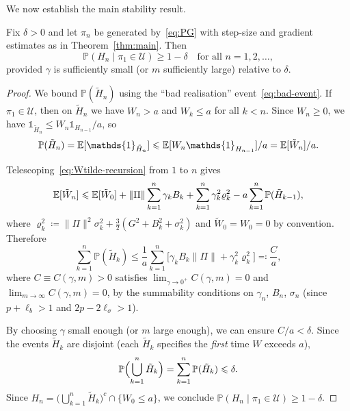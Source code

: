 \documentclass[a4paper,oneside,11pt]{report}
\newcommand{\ind}{\mathds{1}}
\newcommand{\Prob}{\mathbb{P}}
\newcommand{\calU}{\mathcal{U}}
\newcommand{\norm}[1]{\| #1 \|}
\numberwithin{theorem}{chapter}
\numberwithin{equation}{chapter}
\begin{document}
We now establish the main stability result.

\begin{proposition}
  \label{prop:stability}
  Fix $\delta > 0$ and let $\pi_n$ be generated by~\eqref{eq:PG} with
  step-size and gradient estimates as in Theorem~\ref{thm:main}. Then
  \begin{equation}
    \label{eq:stability}
    \Prob(H_n \mid \pi_1 \in \calU) \ge 1 - \delta
    \quad \text{for all } n = 1, 2, \ldots,
  \end{equation}
  provided $\gamma$ is sufficiently small (or $m$ sufficiently large)
  relative to $\delta$.
\end{proposition}

\begin{proof}
  We bound $\Prob(\tilde H_n)$ using the ``bad realisation''
  event~\eqref{eq:bad-event}. If $\pi_1 \in \calU$, then on
  $\tilde H_n$ we have $W_n > a$ and $W_k \le a$ for all $k < n$. Since
  $W_n \ge 0$, we have $\ind_{\tilde H_n} \le W_n \ind_{H_{n-1}} / a$,
  so
  \begin{equation}
    \Prob(\tilde H_n) = \E[\ind_{\tilde H_n}]
    \le \E[W_n \ind_{H_{n-1}}] / a
    = \E[\tilde W_n] / a.
    \label{eq:Htilde-Markov}
  \end{equation}

  Telescoping~\eqref{eq:Wtilde-recursion} from $1$ to $n$ gives
  \begin{equation}
    \E[\tilde W_n] \le \E[\tilde W_0]
    + \norm{\Pi} \sum_{k=1}^n \gamma_k B_k
    + \sum_{k=1}^n \gamma_k^2 \varrho_k^2
    - a \sum_{k=1}^n \Prob(\tilde H_{k-1}),
    \label{eq:Wtilde-telescope}
  \end{equation}
  where
  $\varrho_k^2 \coloneqq \norm{\Pi}^2 \sigma_k^2
  + \tfrac{3}{2}(G^2 + B_k^2 + \sigma_k^2)$ and
  $\tilde W_0 = W_0 = 0$ by convention. Therefore
  \begin{equation}
    \sum_{k=1}^n \Prob(\tilde H_k) \le \frac{1}{a}
    \sum_{k=1}^n \bigl[\gamma_k B_k \norm{\Pi}
      + \gamma_k^2 \varrho_k^2\bigr]
    \eqqcolon \frac{C}{a},
    \label{eq:sum-Htilde}
  \end{equation}
  where $C \equiv C(\gamma, m) > 0$ satisfies
  $\lim_{\gamma \to 0^+} C(\gamma, m) = 0$ and
  $\lim_{m \to \infty} C(\gamma, m) = 0$, by the summability conditions
  on $\gamma_n$, $B_n$, $\sigma_n$ (since $p + \ell_b > 1$ and
  $2p - 2\ell_\sigma > 1$).

  By choosing $\gamma$ small enough (or $m$ large enough), we can ensure
  $C/a < \delta$. Since the events $\tilde H_k$ are disjoint (each
  $\tilde H_k$ specifies the \emph{first} time $W$ exceeds $a$),
  \begin{equation}
    \Prob\Bigl(\bigcup_{k=1}^n \tilde H_k\Bigr)
    = \sum_{k=1}^n \Prob(\tilde H_k) \le \delta.
    \label{eq:union-Htilde}
  \end{equation}
  Since
  $H_n = \bigl(\bigcup_{k=1}^n \tilde H_k\bigr)^c \cap \{W_0 \le a\}$,
  we conclude
  $\Prob(H_n \mid \pi_1 \in \calU) \ge 1 - \delta$.
\end{proof}
\end{document}

